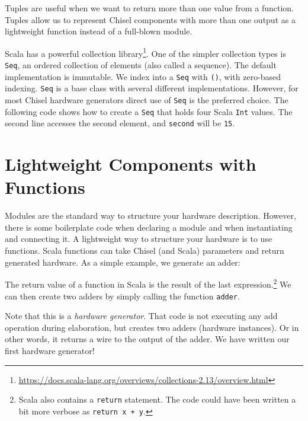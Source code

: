 \documentclass[%
    10pt,
    headinclude, footexclude,
    openright, %
    notitlepage,
    cleardoubleempty,
    headsepline,
    pointlessnumbers,
    bibtotoc, idxtotoc,
    ]{scrbook}
\newcommand{\code}[1]{{\small{\texttt{#1}}}}
\newcommand{\codefoot}[1]{{\footnotesize{\texttt{#1}}}}
\newcommand{\myref}[2]{\href{#1}{#2}}
\renewcommand{\myref}[2]{{#2}{\footnote{\url{#1}}}}
\begin{document}
\noindent Tuples are useful when we want to return more than one value from a function.
Tuples allow us to represent Chisel components with more than one output as a lightweight
function instead of a full-blown module.

Scala has a powerful \myref{https://docs.scala-lang.org/overviews/collections-2.13/overview.html}{collection library}.
One of the simpler collection types is \code{Seq}, an ordered collection of elements (also called a sequence).
The default implementation is immutable. We index into a \code{Seq} with \code{()},
with zero-based indexing.
\code{Seq} is a base class with several different implementations.
However, for most Chisel hardware generators direct use of \code{Seq}
is the preferred choice. The following code shows how to create a \code{Seq}
that holds four Scala \code{Int} values. The second line accesses the
second element, and \code{second} will be \code{15}.






\section{Lightweight Components with Functions}
\label{sec:functions}


Modules are the standard way to structure your hardware description.
However, there is some boilerplate code when declaring a module and when instantiating and
connecting it.
A lightweight way to structure your hardware is to use functions.
Scala functions can take Chisel (and Scala) parameters and return generated hardware.
As a simple example, we generate an adder:


\noindent The return value of a function in Scala is the result of the last
expression.\footnote{Scala also contains a \codefoot{return} statement. The code could have been written
a bit more verbose as \codefoot{return x + y}.}
We can then create two adders by simply calling the function \code{adder}.


\noindent Note that this is a \emph{hardware generator}. That code is not executing any add operation
during elaboration, but creates two adders (hardware instances). Or in other words, it returns
a wire to the output of the adder.
We have written our first hardware generator!
\end{document}
